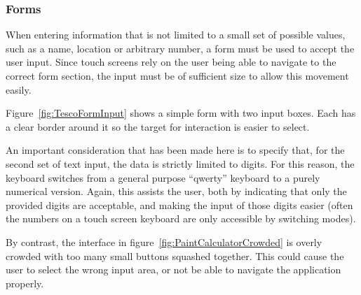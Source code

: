 
\subsubsection{Forms}
\label{ssub:forms}


When entering information that is not limited to a small set of possible
values, such as a name, location or arbitrary number, a form must be used to
accept the user input. Since touch screens rely on the user being able to
navigate to the correct form section, the input must be of sufficient size to
allow this movement easily.

Figure~\ref{fig:TescoFormInput} shows a simple form with two input boxes. Each
has a clear border around it so the target for interaction is easier to select.


An important consideration that has been made here is to specify that, for the
second set of text input, the data is strictly limited to digits. For this
reason, the keyboard switches from a general purpose ``qwerty'' keyboard to a
purely numerical version. Again, this assists the user, both by indicating that
only the provided digits are acceptable, and making the input of those digits
easier (often the numbers on a touch screen keyboard are only accessible by
switching modes).

By contrast, the interface in figure~\ref{fig:PaintCalculatorCrowded} is overly
crowded with too many small buttons squashed together. This could cause the
user to select the wrong input area, or not be able to navigate the application
properly.

